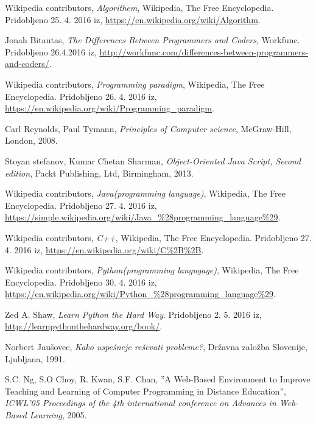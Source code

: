 \begin{thebibliography}{100}
 Wikipedia contributors, \emph{Algorithem},
  Wikipedia, The Free Encyclopedia. Pridobljeno 25. 4. 2016 iz,
  \url{https://en.wikipedia.org/wiki/Algorithm}.

 Jonah Bitautas, \emph{The Differences Between
    Programmers and Coders}, Workfunc. Pridobljeno 26.4.2016 iz,
  \url{http://workfunc.com/differences-between-programmers-and-coders/}.

 Wikipedia contributors, \emph{Programming paradigm}, Wikipedia, The Free Encyclopedia. Pridobljeno
  26. 4. 2016 iz,
  \url{https://en.wikipedia.org/wiki/Programming_paradigm}.

 Carl Reynolds, Paul Tymann, \emph{Principles of Computer science},
  McGraw-Hill, London, 2008.

 Stoyan stefanov, Kumar Chetan Sharman, \emph{Object-Oriented Java Script,
    Second edition}, Packt Publishing, Ltd, Birmingham, 2013.

 Wikipedia contributors, \emph{Java(programming
    language)}, Wikipedia, The Free Encyclopedia. Pridobljeno
  27. 4. 2016 iz,
  \url{https://simple.wikipedia.org/wiki/Java_%28programming_language%29}.

 Wikipedia contributors, \emph{C++}, Wikipedia, The
  Free Encyclopedia. Pridobljeno 27. 4. 2016 iz,
  \url{https://en.wikipedia.org/wiki/C%2B%2B}.

 Wikipedia contributors, \emph{Python(programming
    langugage)}, Wikipedia, The
  Free Encyclopedia. Pridobljeno 30. 4. 2016 iz,
  \url{https://en.wikipedia.org/wiki/Python_%28programming_language%29}.

 Zed A. Shaw, \emph{Learn Python the Hard Way}. Pridobljeno 2. 5. 2016
  iz, \url{http://learnpythonthehardway.org/book/}.

 Norbert Jaušovec, \emph{Kako uspešneje
    reševati probleme?}, Državna založba Slovenije, Ljubljana, 1991.


 S.C. Ng, S.O Choy, R. Kwan, S.F. Chan,
  ''A Web-Based Environment to Improve Teaching and Learning of
  Computer Programming in Distance Education'', \emph{ICWL'05
    Proceedings of the 4th international conference on Advances in
    Web-Based Learning}, 2005.


\end{thebibliography}

